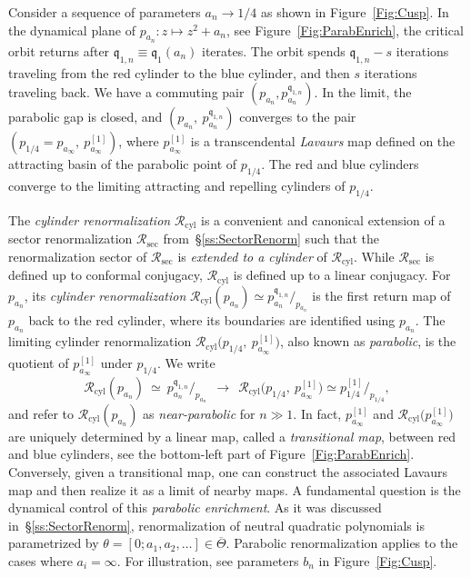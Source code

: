 \documentclass[twoside,leqno]{article}
\theoremstyle{plain}
\renewcommand{\sec}{{\operatorname{sec}}}
\newcommand{\cyl}{{\operatorname{cyl}}}
\newcommand{\ovlTheta}{{\overline \Theta}}
\newcommand{\qq}{\mathfrak{q}}
\newcommand{\RR}{{\mathcal R}}
\begin{document}
Consider a sequence of parameters $a_n\to 1/4$ as shown in Figure~\ref{Fig:Cusp}. In the dynamical plane of $p_{a_n}\colon z\mapsto z^2+a_n$, see Figure~\ref{Fig:ParabEnrich}, the critical orbit returns after $\qq_{1,n}\equiv \qq_1(a_n)$ iterates. The orbit spends $\qq_{1,n}-s$ iterations traveling from the red cylinder to the blue cylinder, and then $s$ iterations traveling back. We have a commuting pair $(p_{a_n}, p_{a_n}^{\qq_{1,n}})$. In the limit, the parabolic gap is closed, and  $(p_{a_n},\  p_{a_n}^{\qq_{1,n}})$ converges to the pair $(p_{1/4}=p_{a_\infty},\ p_{a_\infty}^{[1]})$, where $p_{a_\infty}^{[1]}$ is a transcendental \emph{Lavaurs} map defined on the attracting basin of the parabolic point of $p_{1/4}$. The red and blue cylinders converge to the limiting attracting and repelling cylinders of $p_{1/4}$. 



The \emph{cylinder renormalization} $\RR_\cyl$ is a convenient and canonical extension of a sector renormalization $\RR_{\sec}$ from~\S\ref{ss:SectorRenorm} such that the renormalization sector of $\RR_{\sec}$ is \emph{extended to a cylinder} of $\RR_\cyl$. While $\RR_{\sec}$ is defined up to conformal conjugacy, $\RR_\cyl$ is defined up to a linear conjugacy. For $p_{a_n}$, its \emph{cylinder renormalization} $\RR_\cyl (p_{a_n})\simeq p_{a_n}^{\qq_{1,n}}/_{p_{a_n}}$ is the first return map of $p_{a_n}$ back to the red cylinder, where its boundaries are identified using $p_{a_n}$. The limiting cylinder renormalization $\RR_\cyl\big(p_{1/4},\ p_{a_\infty}^{[1]}\big)$, also known as \emph{parabolic}, is the quotient of $p_{a_\infty}^{[1]}$ under $p_{1/4}$. We write
 \begin{equation}
 \label{eq:Renorm:Parab}
 \RR_\cyl (p_{a_n}) \ \simeq \ p^{\qq_{1,n}}_{a_n}\big/_{p_{a_n}}   \ \ \longrightarrow \ \ \RR_\cyl\big(p_{1/4},\ p_{a_\infty}^{[1]}\big)\simeq p^{[1]}_{1/4}\big/_{p_{1/4}},
 \end{equation}
 and refer to $\RR_\cyl (p_{a_n})$ as \emph{near-parabolic} for $n\gg 1$. In fact, $p_{a_\infty}^{[1]}$ and $\RR_\cyl\big(p_{a_\infty}^{[1]}\big)$ are uniquely determined by a linear map, called a \emph{transitional map}, between red and blue cylinders, see the bottom-left part of Figure~\ref{Fig:ParabEnrich}. Conversely, given a transitional map, one can construct the associated Lavaurs map and then realize it as a limit of nearby maps. A fundamental question is the dynamical control of this \emph{parabolic enrichment}.  As it was discussed in~\S\ref{ss:SectorRenorm}, renormalization of neutral quadratic polynomials is parametrized by $\theta= [0;a_1,a_2,\dots]\in \ovlTheta$. Parabolic renormalization applies to the cases where $a_i=\infty$. For illustration, see parameters $b_n$ in Figure~\ref{Fig:Cusp}.
\end{document}
